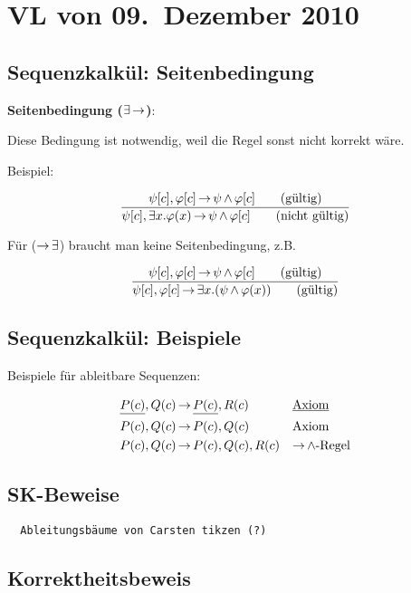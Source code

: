 \section{VL von 09.~Dezember 2010}

\subsection{Sequenzkalkül: Seitenbedingung}

\textbf{Seitenbedingung ($\exists\operatorname{\rightarrow}$)}:

Diese Bedingung ist notwendig, weil die Regel sonst nicht korrekt wäre.

Beispiel:

\[
  \frac{
    \psi[c], \varphi[c] \operatorname{\rightarrow} \psi\operatorname{\wedge}\varphi[c] \qquad\text{(gültig)}
  }{
    \psi[c], \exists x.\varphi(x) \operatorname{\rightarrow} \psi\operatorname{\wedge}\varphi[c] \qquad\text{(nicht gültig)}
  }
\]

Für ($\operatorname{\rightarrow}\exists$) braucht man keine Seitenbedingung, z.B.

\[
  \frac{
    \psi[c], \varphi[c] \operatorname{\rightarrow} \psi\operatorname{\wedge}\varphi[c]  \qquad\text{(gültig)}
  }{
    \psi[c], \varphi[c] \operatorname{\rightarrow} \exists x.(\psi\operatorname{\wedge}\varphi(x)) \qquad\text{(gültig)}
  }
\]

\subsection{Sequenzkalkül: Beispiele}

Beispiele für ableitbare Sequenzen:

\begin{align*}
  \underline{P(c)}, Q(c) &\operatorname{\rightarrow} \underline{P(c)}, R(c) && \text{\underline{Axiom}} \\
  P(c), Q(c) &\operatorname{\rightarrow} P(c), Q(c) && \text{Axiom}\\
  P(c), Q(c) &\operatorname{\rightarrow} P(c), Q(c), R(c) && \text{$\operatorname{\rightarrow}\operatorname{\wedge}$-Regel}
\end{align*}

\subsection{SK-Beweise}

\begin{verbatim}
  Ableitungsbäume von Carsten tikzen (?)
\end{verbatim}

\subsection{Korrektheitsbeweis}


